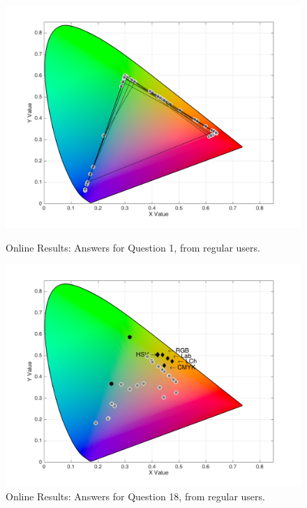 \begin{figure}[!htbp]
  \centering
  \begin{minipage}{0.48\textwidth}
    \centering
    \includegraphics[width=\textwidth]{images/results/1_online_regularUsers.png}
    \caption[Online Results: Answers for Question 1, from regular users.]{Online Results: Answers for Question 1, from regular users.}
    \label{fig:yellowblend_1}
  \end{minipage}\hfill
  \begin{minipage}{0.48\textwidth}
    \centering
    \includegraphics[width=\textwidth]{images/results/18_online_regularUsers.png}
    \caption[Online Results: Answers for Question 18, from regular users.]{Online Results: Answers for Question 18, from regular users.}
    \label{fig:yellowblend_2}
  \end{minipage}
\end{figure}
%
